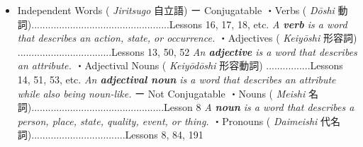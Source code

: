 \begin{itemize}

\item  Independent Words  ( \emph{Jiritsugo }自立語) \hfill\break
\hfill\break
ー Conjugatable  \hfill\break
\hfill\break
・Verbs ( \emph{Dōshi }動詞)\dothyp{}\dothyp{}\dothyp{}\dothyp{}\dothyp{}\dothyp{}\dothyp{}\dothyp{}\dothyp{}\dothyp{}\dothyp{}\dothyp{}\dothyp{}\dothyp{}\dothyp{}\dothyp{}\dothyp{}\dothyp{}\dothyp{}\dothyp{}\dothyp{}\dothyp{}\dothyp{}\dothyp{}\dothyp{}\dothyp{}\dothyp{}\dothyp{}\dothyp{}\dothyp{}\dothyp{}\dothyp{}\dothyp{}\dothyp{}\dothyp{}\dothyp{}\dothyp{}\dothyp{}\dothyp{}\dothyp{}\dothyp{}\dothyp{}\dothyp{}\dothyp{}\dothyp{}\dothyp{}\dothyp{}\dothyp{}..Lessons 16, 17, 18, etc. \hfill\break
  \emph{A \textbf{verb }is a word that describes an action, state, or occurrence. } \hfill\break
・Adjectives ( \emph{Keiyōshi }形容詞) \dothyp{}\dothyp{}\dothyp{}\dothyp{}\dothyp{}\dothyp{}\dothyp{}\dothyp{}\dothyp{}\dothyp{}\dothyp{}\dothyp{}\dothyp{}\dothyp{}\dothyp{}\dothyp{}\dothyp{}\dothyp{}\dothyp{}\dothyp{}\dothyp{}\dothyp{}\dothyp{}\dothyp{}\dothyp{}\dothyp{}\dothyp{}\dothyp{}\dothyp{}\dothyp{}\dothyp{}\dothyp{}\dothyp{}.Lessons 13, 50, 52 \hfill\break
 \emph{An \textbf{adjective }is a word that describes an attribute. }\hfill\break
・Adjectival Nouns ( \emph{Keiyōdōshi }形容動詞) \dothyp{}\dothyp{}\dothyp{}\dothyp{}\dothyp{}\dothyp{}\dothyp{}\dothyp{}\dothyp{}\dothyp{}\dothyp{}\dothyp{}\dothyp{}\dothyp{}\dothyp{}.Lessons 14, 51, 53, etc. \hfill\break
  \emph{An \textbf{adjectival noun }is a word that describes an attribute while also being noun-like. \hfill\break
}\hfill\break
ー Not Conjugatable  \hfill\break
\hfill\break
・Nouns ( \emph{Meishi }名詞)\dothyp{}\dothyp{}\dothyp{}\dothyp{}\dothyp{}\dothyp{}\dothyp{}\dothyp{}\dothyp{}\dothyp{}\dothyp{}\dothyp{}\dothyp{}\dothyp{}\dothyp{}\dothyp{}\dothyp{}\dothyp{}\dothyp{}\dothyp{}\dothyp{}\dothyp{}\dothyp{}\dothyp{}\dothyp{}\dothyp{}\dothyp{}\dothyp{}\dothyp{}\dothyp{}\dothyp{}\dothyp{}\dothyp{}\dothyp{}\dothyp{}\dothyp{}\dothyp{}\dothyp{}\dothyp{}\dothyp{}\dothyp{}\dothyp{}\dothyp{}\dothyp{}\dothyp{}\dothyp{}\dothyp{}\dothyp{}Lesson 8 \hfill\break
  \emph{A \textbf{noun }is a word that describes a person, place, state, quality, event, or thing. }\hfill\break
・Pronouns ( \emph{Daimeishi }代名詞)\dothyp{}\dothyp{}\dothyp{}\dothyp{}\dothyp{}\dothyp{}\dothyp{}\dothyp{}\dothyp{}\dothyp{}\dothyp{}\dothyp{}\dothyp{}\dothyp{}\dothyp{}\dothyp{}\dothyp{}\dothyp{}\dothyp{}\dothyp{}\dothyp{}\dothyp{}\dothyp{}\dothyp{}\dothyp{}\dothyp{}\dothyp{}\dothyp{}\dothyp{}\dothyp{}\dothyp{}\dothyp{}\dothyp{}.Lessons 8, 84, 191 \hfill\break

\end{itemize}
